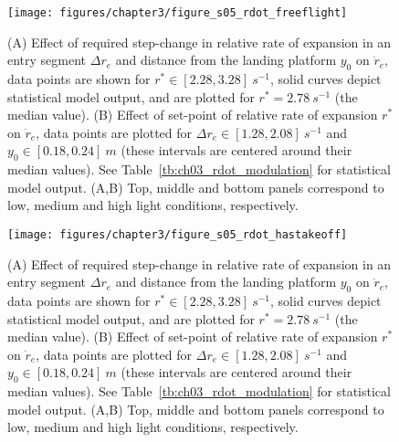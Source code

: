 \begin{figure}[H]
	\centering
	\texttt{[image: figures/chapter3/figure\_s05\_rdot\_freeflight]}
	\caption{ (A) Effect of required step-change in relative rate of expansion in an entry segment $\Delta r_e$ and distance from the landing platform $y_0$ on $\dot{r}_e$, data points are shown for $r^* \in [2.28,3.28]~s^{-1}$, solid curves depict statistical model output, and are plotted for $r^*=2.78~s^{-1}$ (the median value). (B) Effect of set-point of relative rate of expansion $r^*$ on $\dot{r}_e$, data points are plotted for $\Delta r_e \in [1.28, 2.08]~s^{-1}$ and $y_0 \in [0.18, 0.24]~m$ (these intervals are centered around their median values). See Table~\ref{tb:ch03_rdot_modulation} for statistical model output. (A,B) Top, middle and bottom panels correspond to low, medium and high light conditions, respectively.}
	\label{figure_s05_rdot_freeflight}
\end{figure}

\begin{figure}[H]
	\centering
	\texttt{[image: figures/chapter3/figure\_s05\_rdot\_hastakeoff]}
	\caption{ (A) Effect of required step-change in relative rate of expansion in an entry segment $\Delta r_e$ and distance from the landing platform $y_0$ on $\dot{r}_e$, data points are shown for $r^* \in [2.28,3.28]~s^{-1}$, solid curves depict statistical model output, and are plotted for $r^*=2.78~s^{-1}$ (the median value). (B) Effect of set-point of relative rate of expansion $r^*$ on $\dot{r}_e$, data points are plotted for $\Delta r_e \in [1.28, 2.08]~s^{-1}$ and $y_0 \in [0.18, 0.24]~m$ (these intervals are centered around their median values). See Table~\ref{tb:ch03_rdot_modulation} for statistical model output. (A,B) Top, middle and bottom panels correspond to low, medium and high light conditions, respectively.}
	\label{figure_s05_rdot_hastakeoff}
\end{figure}

